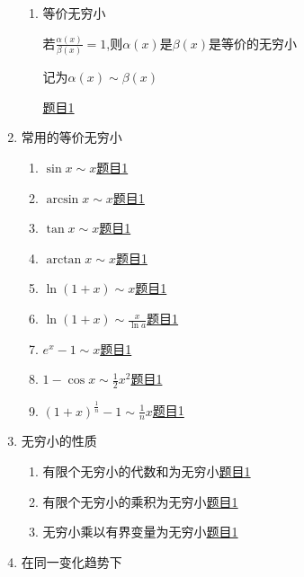 \documentclass[12pt]{article} %
\begin{document}
\begin{enumerate}
\begin{enumerate}
        \item 等价无穷小
        \par 若$\displaystyle\frac{\alpha(x)}{\beta(x)}=1$,则$\alpha(x)$是$\beta(x)$是等价的无穷小
        \par 记为$\alpha(x)\sim\beta(x)$
        \par \href{https://www.matongxue.com/matex/2580/react/}{题目1} 
    \end{enumerate}
\item 常用的等价无穷小
    \begin{enumerate}
        \item $\sin x\sim x$\quad \href{https://www.matongxue.com/matex/2584/react/}{题目1} 
        \item $\arcsin x\sim x$\quad \href{https://www.matongxue.com/matex/2585/react/}{题目1} 
        \item $\tan x\sim x$\quad \href{https://www.matongxue.com/matex/2586/react/}{题目1} 
        \item $\arctan x\sim x$\quad \href{https://www.matongxue.com/matex/2587/react/}{题目1} 
        \item $\ln(1+x)\sim x$\quad \href{https://www.matongxue.com/matex/2588/react/}{题目1} 
        \item $\displaystyle\ln(1+x)\sim \frac{x}{\ln a}$\quad \href{https://www.matongxue.com/matex/2590/react/}{题目1} 
        \item $e^x-1 \sim x$\quad \href{https://www.matongxue.com/matex/2589/react/}{题目1} 
        \item $1-\cos x\sim \frac{1}{2}x^2$\quad \href{https://www.matongxue.com/matex/2591/react/}{题目1} 
        \item $(1+x)^{\frac{1}{n}}-1\sim \frac{1}{n}x$\quad \href{https://www.matongxue.com/matex/2592/react/}{题目1} 
    \end{enumerate}
\item 无穷小的性质
    \begin{enumerate}
        \item 有限个无穷小的代数和为无穷小\quad \href{https://www.matongxue.com/matex/2593/react/}{题目1} 
        \item 有限个无穷小的乘积为无穷小\quad \href{https://www.matongxue.com/matex/2594/react/}{题目1} 
        \item 无穷小乘以有界变量为无穷小\quad \href{https://www.matongxue.com/matex/2595/react/}{题目1} 
    \end{enumerate}
\item 在同一变化趋势下
    \begin{enumerate}

\end{enumerate}
\end{enumerate}
\end{document}
